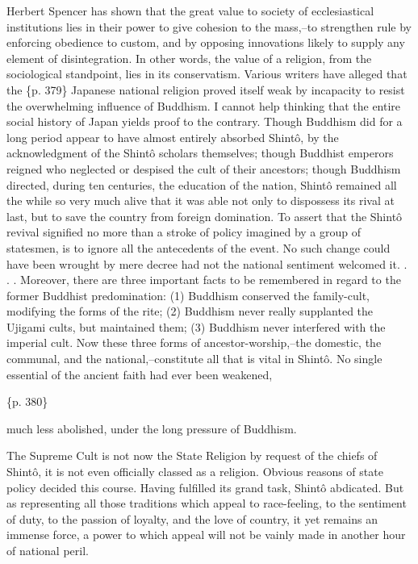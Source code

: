 Herbert Spencer has shown that the great value to society of ecclesiastical institutions lies in their power to give cohesion to the mass,--to strengthen rule by enforcing obedience to custom, and by opposing innovations likely to supply any element of disintegration. In other words, the value of a religion, from the sociological standpoint, lies in its conservatism. Various writers have alleged that the \{p. 379\} Japanese national religion proved itself weak by incapacity to resist the overwhelming influence of Buddhism. I cannot help thinking that the entire social history of Japan yields proof to the contrary. Though Buddhism did for a long period appear to have almost entirely absorbed Shintô, by the acknowledgment of the Shintô scholars themselves; though Buddhist emperors reigned who neglected or despised the cult of their ancestors; though Buddhism directed, during ten centuries, the education of the nation, Shintô remained all the while so very much alive that it was able not only to dispossess its rival at last, but to save the country from foreign domination. To assert that the Shintô revival signified no more than a stroke of policy imagined by a group of statesmen, is to ignore all the antecedents of the event. No such change could have been wrought by mere decree had not the national sentiment welcomed it. . . . Moreover, there are three important facts to be remembered in regard to the former Buddhist predomination: (1) Buddhism conserved the family-cult, modifying the forms of the rite; (2) Buddhism never really supplanted the Ujigami cults, but maintained them; (3) Buddhism never interfered with the imperial cult. Now these three forms of ancestor-worship,--the domestic, the communal, and the national,--constitute all that is vital in Shintô. No single essential of the ancient faith had ever been weakened,

\{p. 380\}

much less abolished, under the long pressure of Buddhism.



The Supreme Cult is not now the State Religion by request of the chiefs of Shintô, it is not even officially classed as a religion. Obvious reasons of state policy decided this course. Having fulfilled its grand task, Shintô abdicated. But as representing all those traditions which appeal to race-feeling, to the sentiment of duty, to the passion of loyalty, and the love of country, it yet remains an immense force, a power to which appeal will not be vainly made in another hour of national peril.

